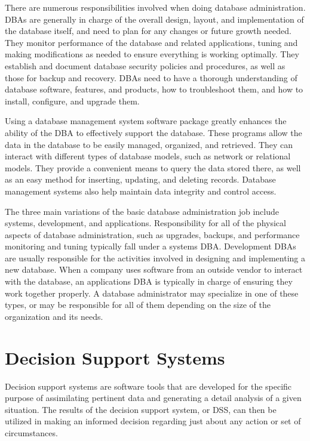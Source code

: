 There are numerous responsibilities involved when doing database administration. DBAs are generally in charge of the overall design, layout, and implementation of the database itself, and need to plan for any changes or future growth needed. They monitor performance of the database and related applications, tuning and making modifications as needed to ensure everything is working optimally. They establish and document database security policies and procedures, as well as those for backup and recovery. DBAs need to have a thorough understanding of database software, features, and products, how to troubleshoot them, and how to install, configure, and upgrade them.

Using a database management system software package greatly enhances the ability of the DBA to effectively support the database. These programs allow the data in the database to be easily managed, organized, and retrieved. They can interact with different types of database models, such as network or relational models. They provide a convenient means to query the data stored there, as well as an easy method for inserting, updating, and deleting records. Database management systems also help maintain data integrity and control access.

The three main variations of the basic database administration job include systems, development, and applications. Responsibility for all of the physical aspects of database administration, such as upgrades, backups, and performance monitoring and tuning typically fall under a systems DBA. Development DBAs are usually responsible for the activities involved in designing and implementing a new database. When a company uses software from an outside vendor to interact with the database, an applications DBA is typically in charge of ensuring they work together properly. A database administrator may specialize in one of these types, or may be responsible for all of them depending on the size of the organization and its needs.



\section{Decision Support Systems}
Decision support systems are software tools that are developed for the specific purpose of assimilating pertinent data and generating a detail analysis of a given situation. The results of the decision support system, or DSS, can then be utilized in making an informed decision regarding just about any action or set of circumstances.

